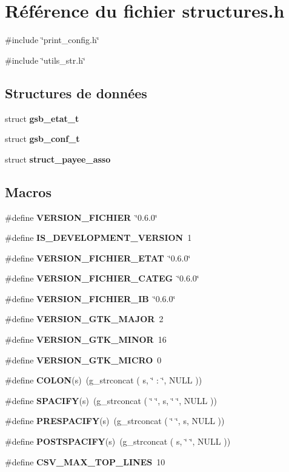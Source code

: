\section{Référence du fichier structures.h}
\label{structures_8h}
{\ttfamily \#include \char`\"{}print\_\-config.h\char`\"{}}\par
{\ttfamily \#include \char`\"{}utils\_\-str.h\char`\"{}}\par
\subsection*{Structures de données}
\begin{DoxyCompactItemize}
\item 
struct {\bf gsb\_\-etat\_\-t}
\item 
struct {\bf gsb\_\-conf\_\-t}
\item 
struct {\bf struct\_\-payee\_\-asso}
\end{DoxyCompactItemize}
\subsection*{Macros}
\begin{DoxyCompactItemize}
\item 
\#define {\bf VERSION\_\-FICHIER}~\char`\"{}0.6.0\char`\"{}
\item 
\#define {\bf IS\_\-DEVELOPMENT\_\-VERSION}~1
\item 
\#define {\bf VERSION\_\-FICHIER\_\-ETAT}~\char`\"{}0.6.0\char`\"{}
\item 
\#define {\bf VERSION\_\-FICHIER\_\-CATEG}~\char`\"{}0.6.0\char`\"{}
\item 
\#define {\bf VERSION\_\-FICHIER\_\-IB}~\char`\"{}0.6.0\char`\"{}
\item 
\#define {\bf VERSION\_\-GTK\_\-MAJOR}~2
\item 
\#define {\bf VERSION\_\-GTK\_\-MINOR}~16
\item 
\#define {\bf VERSION\_\-GTK\_\-MICRO}~0
\item 
\#define {\bf COLON}(s)~(g\_\-strconcat ( s, \char`\"{} : \char`\"{}, NULL ))
\item 
\#define {\bf SPACIFY}(s)~(g\_\-strconcat ( \char`\"{} \char`\"{}, s, \char`\"{} \char`\"{}, NULL ))
\item 
\#define {\bf PRESPACIFY}(s)~(g\_\-strconcat ( \char`\"{} \char`\"{}, s, NULL ))
\item 
\#define {\bf POSTSPACIFY}(s)~(g\_\-strconcat ( s, \char`\"{} \char`\"{}, NULL ))
\item 
\#define {\bf CSV\_\-MAX\_\-TOP\_\-LINES}~10
\end{DoxyCompactItemize}
